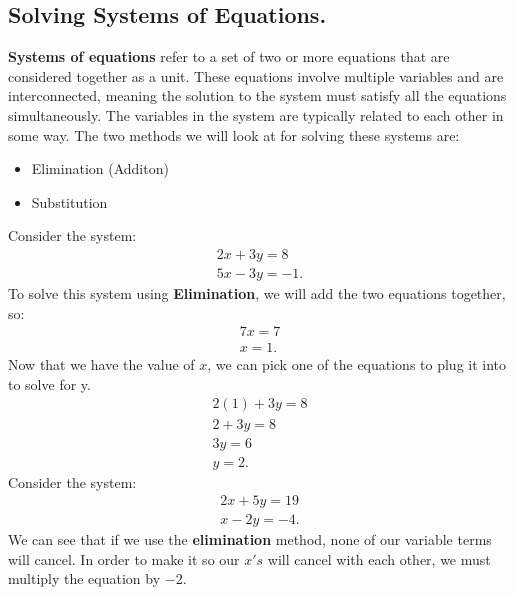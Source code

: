 \documentclass{report}
\begin{document}
    \subsection{Solving Systems of Equations.}
    \bigbreak \noindent 
    \smallbreak \noindent
    \begin{definition}
   \textbf{Systems of equations} refer to a set of two or more equations that are considered together as a unit. These equations involve multiple variables and are interconnected, meaning the solution to the system must satisfy all the equations simultaneously. The variables in the system are typically related to each other in some way.
            \bigbreak \noindent
      \bigbreak \noindent 
      The two methods we will look at for solving these systems are:
      \begin{itemize}
        \item Elimination (Additon)
        \item Substitution 
      \end{itemize}

    \end{definition}
    \bigbreak \noindent 
      Consider the system:
      \begin{align*}
        2x +3y = 8 \\
        5x - 3y = -1
      .\end{align*}
      \bigbreak \noindent 
      To solve this system using \textbf{Elimination}, we will add the two equations together, so:
      \begin{align*}
        7x = 7 \\ 
        x= 1
      .\end{align*}
      \bigbreak \noindent 
      Now that we have the value of $x $, we can pick one of the equations to plug it into to solve for y.
      \begin{align*}
        2(1)  +3y = 8 \\
        2 + 3y = 8 \\
        3y = 6 \\ 
        y  =2
      .\end{align*}
    \bigbreak \noindent 
      Consider the system:
      \begin{align*}
        2x +5y = 19 \\
        x - 2y = -4
      .\end{align*}
      \bigbreak \noindent 
      We can see that if we use the \textbf{elimination} method, none of our variable terms will cancel. In order to make it so our $x's$ will cancel with each other, we must multiply the equation by $-2$.
\end{document}

